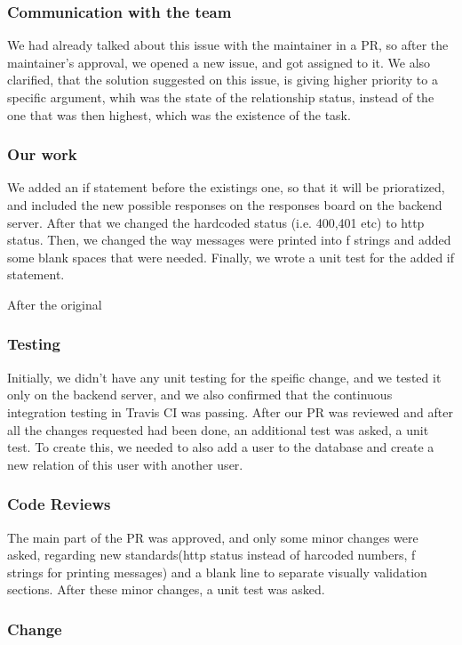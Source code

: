 \documentclass{article}
\begin{document}
\vfill
\clearpage
\subsubsection{Communication with the team}
We had already talked about this issue with the maintainer in a PR, so after the maintainer's approval, we opened a new issue, and got assigned to it. We also clarified, that the solution suggested on this issue, is giving higher priority to a specific argument, whih was the state of the relationship status, instead of the one that was then highest, which was the existence of the task.

\subsubsection{Our work}

We added an if statement before the existings one, so that it will be prioratized, and included the new possible responses on the responses board on the backend server. After that we changed the hardcoded status (i.e. 400,401 etc) to http status. Then, we changed the way messages were printed into f strings and added some blank spaces that were needed. Finally, we wrote a unit test for the added if statement.

After the original 
\subsubsection{Testing}
Initially, we didn't have any unit testing for the speific change, and we tested it only on the backend server, and we also confirmed that the continuous integration testing in Travis CI was passing. 
After our PR was reviewed and after all the changes requested had been done, an additional test was asked, a unit test. To create this, we needed to also add a user to the database and create a new relation of this user with another user.

\subsubsection{Code Reviews}
The main part of the PR was approved, and only some minor changes were asked, regarding new standards(http status instead of harcoded numbers, f strings for printing messages) and a blank line to separate visually validation sections. After these minor changes, a unit test was asked.
\subsubsection{Change}
\end{document}
